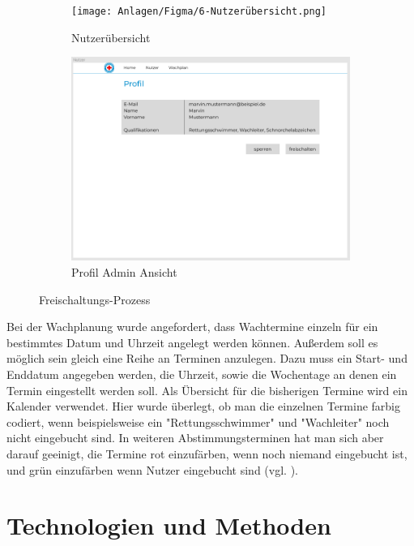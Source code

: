 \documentclass[fontsize=12pt,openright,oneside,paper=a4,BCOR=1cm]{scrbook}
\begin{document}
\begin{figure}[h!]
  \centering
  \begin{subfigure}[b]{0.4\linewidth}
    \texttt{[image: Anlagen/Figma/6-Nutzerübersicht.png]}
    \caption{Nutzerübersicht}
  \end{subfigure}
  \begin{subfigure}[b]{0.4\linewidth}
    \includegraphics[width=\linewidth]{Anlagen/Figma/7-ProfilAdminSicht.png}
    \caption{Profil Admin Ansicht}
  \end{subfigure}
  \caption{Freischaltungs-Prozess}
  \label{fig:freischaltprozess}
\end{figure}

Bei der Wachplanung wurde angefordert, dass Wachtermine einzeln für ein bestimmtes Datum und Uhrzeit angelegt werden können. Außerdem soll es möglich sein gleich eine Reihe an Terminen anzulegen. Dazu muss ein Start- und Enddatum angegeben werden, die Uhrzeit, sowie die Wochentage an denen ein Termin eingestellt werden soll. Als Übersicht für die bisherigen Termine wird ein Kalender verwendet. Hier wurde überlegt, ob man die einzelnen Termine farbig codiert, wenn beispielsweise ein "Rettungsschwimmer" und "Wachleiter" noch nicht eingebucht sind. In weiteren Abstimmungsterminen hat man sich aber darauf geeinigt, die Termine rot einzufärben, wenn noch niemand eingebucht ist, und grün einzufärben wenn Nutzer eingebucht sind (vgl. \cite[S. 49]{sklar2011principles}).


%
%
\renewcommand{\cleardoublepage}{}
\chapter{Technologien und Methoden}
\end{document}
